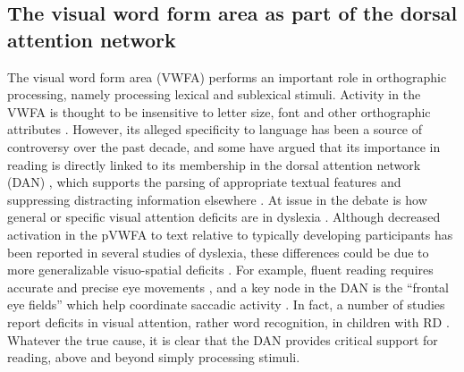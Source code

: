 \subsection{The visual word form area as part of the dorsal attention network} 
The visual word form area (VWFA) performs an important role in orthographic processing, namely processing lexical and sublexical stimuli. Activity in the VWFA is thought to be insensitive to letter size, font and other orthographic attributes \citep{Cohen2002}. However, its alleged specificity to language has been a source of controversy over the past decade, and some have argued that its importance in reading is directly linked to its membership in the dorsal attention network (DAN) \citep{Vogel2012a}, which supports the parsing of appropriate textual features and suppressing distracting information elsewhere \citep{Corbetta2002}. At issue in the debate is how general or specific visual attention deficits are in dyslexia \citep{Vogel2014}. Although decreased activation in the pVWFA to text relative to typically developing participants has been reported in several studies of dyslexia, these differences could be due to more generalizable visuo-spatial deficits  \citep{Richlan2009}. For example, fluent reading requires accurate and precise eye movements \citep{Rayner1978}, and a key node in the DAN is the ``frontal eye fields'' which help coordinate saccadic activity \citep{Connolly2002}. In fact, a number of studies report deficits in visual attention, rather word recognition, in children with RD \citep{Vidyasagar2010}.  Whatever the true cause, it is clear that the DAN provides critical support for reading, above and beyond simply processing stimuli.

